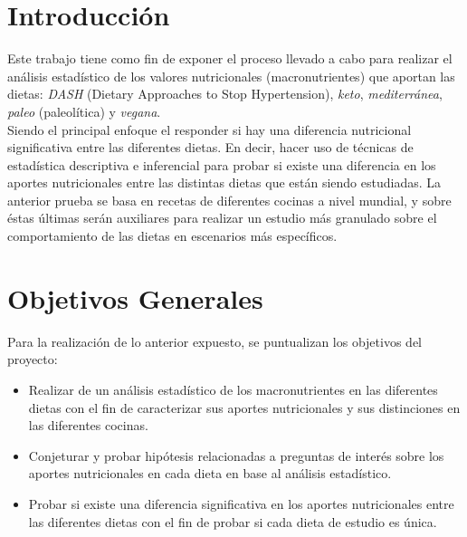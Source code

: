 \documentclass[12pt,a4paper]{article}
\begin{document}
    \newpage

    \tableofcontents

    \newpage

    \section{Introducción}
    {
        Este trabajo tiene como fin de exponer el proceso llevado a cabo para 
        realizar el análisis estadístico de los valores nutricionales (macronutrientes) 
        que aportan las dietas: \emph{DASH} (Dietary Approaches to Stop Hypertension), 
        \emph{keto}, \emph{mediterránea}, \emph{paleo} (paleolítica) y \emph{vegana}.\\

        Siendo el principal enfoque el responder si hay una diferencia nutricional 
        significativa entre las diferentes dietas. En decir, hacer uso de 
        técnicas de estadística descriptiva e inferencial para probar si existe 
        una diferencia en los aportes nutricionales entre las distintas dietas que 
        están siendo estudiadas. La anterior prueba se basa en recetas de diferentes 
        cocinas a nivel mundial, y sobre éstas últimas serán auxiliares para realizar 
        un estudio más granulado sobre el comportamiento de las dietas en escenarios 
        más específicos.
    }

    \section{Objetivos Generales}
    {
        Para la realización de lo anterior expuesto, se puntualizan los objetivos del 
        proyecto:
        \begin{itemize}
            \item Realizar de un análisis estadístico de los macronutrientes en las 
            diferentes dietas con el fin de caracterizar sus aportes nutricionales y 
            sus distinciones en las diferentes cocinas.
            
            \item Conjeturar y probar hipótesis relacionadas a preguntas de interés 
            sobre los aportes nutricionales en cada dieta en base al análisis estadístico. 
            
            \item Probar si existe una diferencia significativa en los aportes 
            nutricionales entre las diferentes dietas con el fin de probar si cada 
            dieta de estudio es única.
        \end{itemize}
    }
\end{document}
